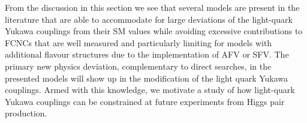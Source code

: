 

From the discussion in this section we see that several models are present in the literature that are able to accommodate for large deviations of the light-quark Yukawa couplings from their SM values while avoiding excessive contributions to FCNCs that are well measured and particularly limiting for models with additional flavour structures due to the implementation of AFV or SFV. The primary new physics deviation, complementary to direct searches, in the presented models will show up in the modification of the light quark Yukawa couplings. Armed with this knowledge, we motivate a study of how light-quark Yukawa couplings can be constrained at future experiments from Higgs pair production.

